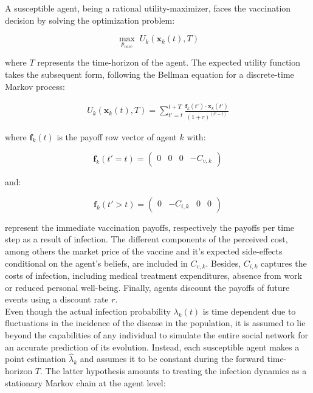 \documentclass[11pt]{article}
\begin{document}
A susceptible agent, being a rational utility-maximizer, faces the vaccination decision by solving the optimization problem:

\begin{equation}\label{eq:6}
	\max_{{p_{vacc}}} \; U_k(\mathbf{x}_k(t), T)
\end{equation}

where \(T\) represents the time-horizon of the agent. The expected utility function takes the subsequent form, following the Bellman equation for a discrete-time Markov process:

\begin{equation}\label{eq:7}
	\begin{split}
		U_k(\mathbf{x}_k(t), T) = \sum_{t'=t}^{t + T} \frac{  \mathbf{f}_k(t') \cdot \mathbf{x}_k(t')}{(1+r)^{(t'-t)}}
	\end{split}
\end{equation}

where \(\mathbf{f}_k(t)\) is the payoff row vector of agent \(k\) with: 

\begin{equation}\label{eq:8}
	\mathbf{f}_k(t' = t)=\left( \begin{array}{cccc}0&0&0&-C_{v,k} \end{array} \right)
\end{equation}

and:

\begin{equation}\label{eq:9}
\mathbf{f}_k(t' > t)=\left( \begin{array}{cccc} 0&-C_{i,k}&0&0 \end{array} \right)
\end{equation}

represent the immediate vaccination payoffs, respectively the payoffs per time step as a result of infection.  
The different components of the perceived cost, among others the market price of the vaccine and it's expected side-effects conditional on the agent's beliefs, are included in \(C_{v,k}\). Besides, \(C_{i,k}\) captures the costs of infection, including medical treatment expenditures, absence from work or reduced personal well-being. Finally, agents discount the payoffs of future events using a discount rate \(r\).\\
Even though the actual infection probability  \(\lambda_{k}(t)\) is time dependent due to fluctuations in the incidence of the disease in the population, it is assumed to lie beyond the capabilities of any individual to simulate the entire social network for an accurate prediction of its evolution. Instead, each susceptible agent makes a point estimation \(\hat{\lambda}_{k}\) and assumes it to be constant during the forward time-horizon \(T\). The latter hypothesis amounts to treating the infection dynamics as a stationary Markov chain at the agent level:
\end{document}
